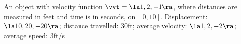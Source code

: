 {An object with velocity function $\vvt = \la 1,2,-1\ra$, where distances are measured in feet and time is in seconds, on $[0,10]$.
}
{Displacement: $\la 10,20,-20\ra$; distance travelled: $30$ft; average velocity: $\la 1,2,-2\ra$; average speed: $3$ft/s
}